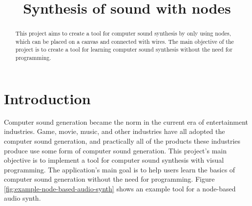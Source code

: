 \documentclass[conference]{IEEEtran}
\begin{document}
\title{Synthesis of sound with nodes}

\maketitle

\begin{abstract}
This project aims to create a tool for computer sound synthesis by only using nodes, which can be placed on a canvas and connected with wires.
The main objective of the project is to create a tool for learning computer sound synthesis without the need for programming.
\end{abstract}

\IEEEpeerreviewmaketitle

\section{Introduction}
Computer sound generation became the norm in the current era of entertainment industries.
Game, movie, music, and other industries have all adopted the computer sound generation, and practically all of the products these industries produce use some form of computer sound generation.
This project's main objective is to implement a tool for computer sound synthesis with visual programming.
The application's main goal is to help users learn the basics of computer sound generation without the need for programming.
Figure \ref{fig:example-node-based-audio-synth} shows an example tool for a node-based audio synth.
\end{document}
